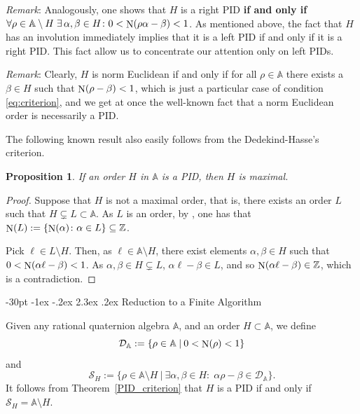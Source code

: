 \documentclass[10pt]{article}
\makeatletter
\renewcommand\section{\@startsection {section}{1}{\z@} {-30pt \@plus
    -1ex \@minus -.2ex} {2.3ex \@plus.2ex}
  {\normalfont\normalsize\bfseries\boldmath}}
\newtheorem{proposition}{Proposition}
\theoremstyle{definition}
\newcommand\A{\mathbb{A}}
\newcommand\ZZ{\mathbb{Z}}
\newcommand\DD{\mathcal{D}}
\newcommand\SC{\mathcal{S}}
\newcommand\N{\mathop{\rm N}\nolimits}
\makeatother
\begin{document}
\noindent\textit{Remark\/}: Analogously, one shows that $H$ is a right
PID \textbf{if and only if}
$ \forall \rho \in \A \setminus H \; \exists \, \alpha, \beta \in H
\colon 0<\N( \rho \alpha - \beta ) <1$. As mentioned above, the fact
that $H$ has an involution immediately implies that it is a left PID
if and only if it is a right PID. This fact allow us to concentrate
our attention only on left PIDs.

\vspace{3mm}

\noindent\textit{Remark\/}: Clearly, $H$ is
norm Euclidean if and only if for all $\rho \in \A$ there exists a
$\beta \in H$ such that $\N (\rho - \beta) < 1$, which is just a
particular case of condition \eqref{eq:criterion}, and we get at once
the well-known fact that a norm Euclidean order is necessarily a PID.

\vspace{3mm}

The following known result also easily follows from the
Dedekind-Hasse's criterion.

\begin{proposition}
  If an order $H$ in $\A$ is a PID, then $H$ is maximal.
\end{proposition}

\begin{proof}
  Suppose that $H$ is not a maximal order, that is, there exists an
  order $L$ such that $H \subsetneq L \subset \A$. As $L$ is an order,
  by \cite[Thm.~10.1, p.~125]{Reiner}, one has that
  $\N(L) : = \{ \N(\alpha) \colon \alpha \in L\} \subseteq \ZZ$.
	
  Pick $\ell \in L \setminus H$. Then, as $\ell \in \A \setminus H $,
  there exist elements $\alpha, \beta \in H$ such that
  $0 < \N(\alpha \ell - \beta) <1$. As
  $\alpha, \beta \in H \subsetneq L$, $\alpha \ell - \beta \in L$, and
  so $\N(\alpha \ell - \beta) \in \ZZ$, which is a contradiction.
\end{proof}
\section{Reduction to a Finite Algorithm}\label{fin_alg}

Given any rational quaternion algebra $\A$, and an order $H\subset\A$,
we define
%
\[\DD_\A:=\{\rho \in \A\>|\> 0<\N(\rho)<1\}\]
%
and
%
\[\SC_H:=\{\rho \in \A \setminus H \>|\> \exists \alpha,
\beta \in H:\; \alpha \rho - \beta \in \DD_\A\}.\]
%
It follows from Theorem~\ref{PID_criterion} that $H$ is a PID if and
only if $\SC_H = \A \setminus H$.
\end{document}
